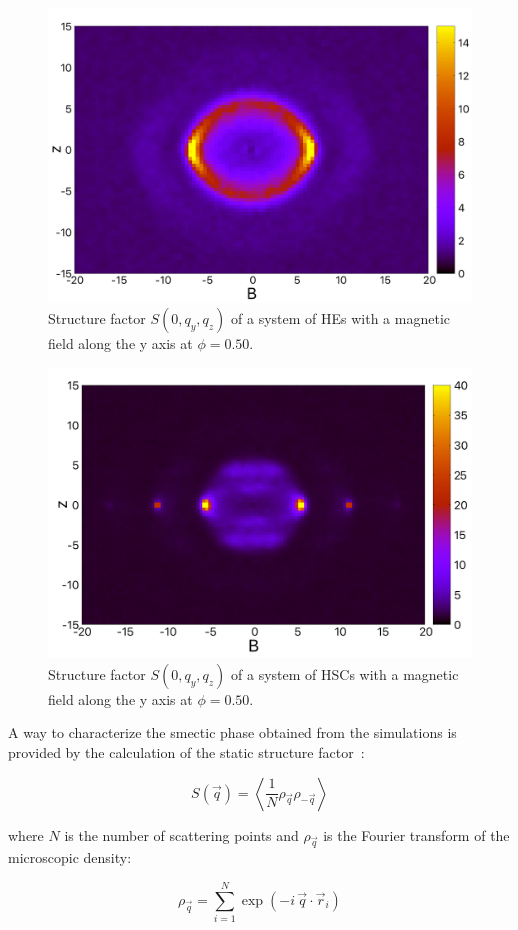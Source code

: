 \documentclass[aip,graphicx]{revtex4-1} %
\begin{document}
\begin{figure}
    \centering
    \includegraphics[width=0.5\columnwidth]{Syz_B_HE.png}
    \caption{Structure factor $S(0, q_y, q_z)$ of a system of HEs with a magnetic field along the y axis at $\phi=0.50$.}\label{fig:Syz_B_HE}
\end{figure}

\begin{figure}
    \centering
    \includegraphics[width=0.5\columnwidth]{Syz_B.png}
    \caption{Structure factor $S(0, q_y, q_z)$ of a system of HSCs with a magnetic field along the y axis at $\phi=0.50$.}\label{fig:Syz_B_HSC}
\end{figure}

A way to characterize the smectic phase obtained from the simulations is provided by the calculation of the static structure factor~\cite{Hansen_McDonald}:

\begin{equation}\label{eq:S_q}
    S( \vec{q} ) = \left\langle \frac{1}{N} \rho_{\vec{q}} \rho_{-\vec{q}} \right\rangle 
\end{equation}

where $N$ is the number of scattering points and $\rho_{\vec{q}}$ is the Fourier transform of the microscopic density:

\begin{equation}
    \rho_{\vec{q}} = \sum_{i=1}^N \exp(-i\, \vec{q} \cdot \vec{r}_i)
\end{equation}
\end{document}
